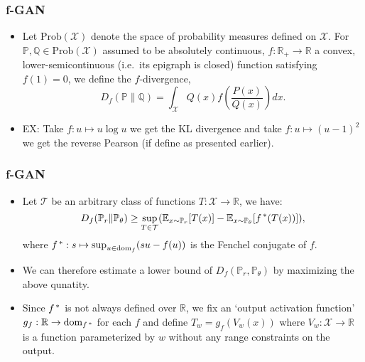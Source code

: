 \begin{frame}
  \frametitle{f-GAN}
  \begin{itemize}
    \item Let $\mathrm{Prob}(\mathcal{X})$ denote the space of probability
      measures defined on $\mathcal{X}$.
      For $\mathbb{P}, \mathbb{Q} \in \mathrm{Prob}(\mathcal{X})$
      assumed to be absolutely continuous,
      $f: \mathbb{R}_+\rightarrow\mathbb{R}$ a convex, lower-semicontinuous
      (i.e.\ its epigraph is closed) function satisfying $f(1) = 0$, we
      define the $f$-divergence,
      \[
        D_f(\mathbb{P}\|\mathbb{Q})
        = \int_{\mathcal{X}} Q(x)f\left(\frac{P(x)}{Q(x)}\right)dx.
      \]
    \item EX: Take $f: u\mapsto u\log u$ we get the KL divergence and take
      $f: u\mapsto (u-1)^2$ we get the reverse Pearson (if define as presented
      earlier).
  \end{itemize}
\end{frame}

\begin{frame}
  \frametitle{f-GAN}
  \begin{itemize}
    \item Let $\mathcal{T}$ be an arbitrary class of functions
      $T: \mathcal{X}\rightarrow\mathbb{R}$, we have:
      \[
        D_f(\mathbb{P}_r\|\mathbb{P}_{\theta})\ge
        \sup_{T\in\mathcal{T}}
        (\mathbb{E}_{x\sim\mathbb{P}_r}[T(x)]
        - \mathbb{E}_{x\sim\mathbb{P}_{\theta}}[f^{\thinspace *}(T(x))]),
      \]
      where $f^{\thinspace *}: s\mapsto\sup_{u\in\mathrm{dom}_f}(su-f(u))$
      is the Fenchel conjugate of $f$.
    \item We can therefore estimate a lower bound of
      $D_f(\mathbb{P}_r, \mathbb{P}_{\theta})$ by maximizing the above
      qunatity.
    \item Since $f^{\thinspace *}$ is not always defined over $\mathbb{R}$,
      we fix an `output activation function'
      $g_f: \mathbb{R}\rightarrow\mathrm{dom}_{f^{\thinspace *}}$ for each
      $f$ and define $T_w = g_f(V_w(x))$ where
      $V_w:\mathcal{X}\rightarrow\mathbb{R}$ is a function parameterized by
      $w$ without any range constraints on the output.
  \end{itemize}
\end{frame}

